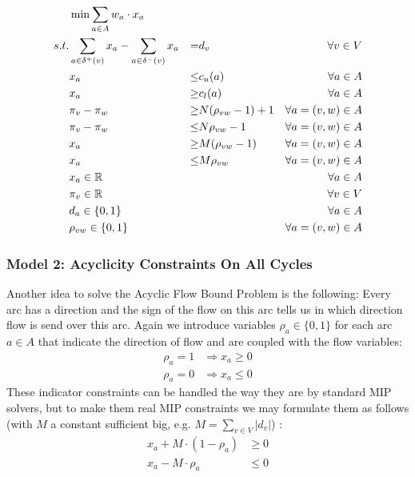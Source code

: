 \begin{align*}
  &\min \sum_{a\in A} w_a\cdot x_a & \\
 s.t. & \sum_{a\in \delta^+(v)}x_a - \sum_{a\in\delta^- (v)}x_a &=& d_v\ &\forall v\in V \\
 & x_a &\le& c_u(a) & \forall a\in A\\
 & x_a &\ge& c_l(a) & \forall a\in A\\
 & \pi_v-\pi_w &\ge & N(\rho_{vw}-1)+1& \forall a=(v,w)\in A\\
 & \pi_v-\pi_w&\le &N\rho_{vw}-1& \forall a=(v,w)\in A\\
 & x_a&\ge& M(\rho_{vw}-1)& \forall a=(v,w)\in A\\
 & x_a&\le & M\rho_{vw}& \forall a=(v,w)\in A\\
 & x_a \in \mathbb{R} & & &\forall a\in A\\
 & \pi_v \in \mathbb{R} & & & \forall v\in V\\
 & d_a \in \{0,1\} & & &\forall a\in A\\
 & \rho_{vw} \in \{0,1\}&&& \forall a=(v,w)\in A\\
\end{align*}

\subsubsection{Model 2: Acyclicity Constraints On All Cycles}

Another idea to solve the Acyclic Flow Bound Problem 
is the following: Every arc has a direction and the 
sign of the flow on this arc tells us in which direction flow is send over this arc. Again we introduce variables 
$\rho_a\in \{0,1\}$ for each arc $a\in A$ that indicate the direction of flow and are coupled with the flow variables:
\begin{align*}
\rho_a=1 & \Rightarrow x_a\ge 0 \\
\rho_a=0 & \Rightarrow x_a\le 0
\end{align*}
These indicator constraints can be handled the way they are by standard MIP solvers, but to make them real MIP 
constraints we may formulate them as follows (with $M$ a constant sufficient big, e.g. $M=\sum_{v\in V}|d_v|$) :
\begin{align*}
 x_a + M\cdot (1-\rho_a) &\ge 0\\
 x_a - M\cdot \rho_a & \le 0
\end{align*}


